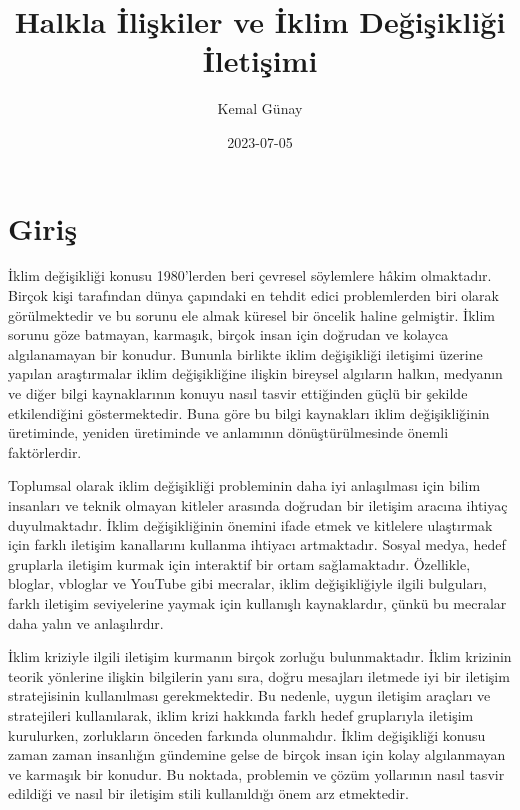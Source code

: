 \documentclass[
]{book}
\title{Halkla İlişkiler ve İklim Değişikliği İletişimi}
\author{Kemal Günay}
\date{2023-07-05}
\begin{document}
\maketitle

{
\setcounter{tocdepth}{1}
\tableofcontents
}
\hypertarget{giriux15f}{%
\chapter*{Giriş}\label{giriux15f}}

İklim değişikliği konusu 1980'lerden beri çevresel söylemlere hâkim olmaktadır. Birçok kişi tarafından dünya çapındaki en tehdit edici problemlerden biri olarak görülmektedir ve bu sorunu ele almak küresel bir öncelik haline gelmiştir. İklim sorunu göze batmayan, karmaşık, birçok insan için doğrudan ve kolayca algılanamayan bir konudur. Bununla birlikte iklim değişikliği iletişimi üzerine yapılan araştırmalar iklim değişikliğine ilişkin bireysel algıların halkın, medyanın ve diğer bilgi kaynaklarının konuyu nasıl tasvir ettiğinden güçlü bir şekilde etkilendiğini göstermektedir. Buna göre bu bilgi kaynakları iklim değişikliğinin üretiminde, yeniden üretiminde ve anlamının dönüştürülmesinde önemli faktörlerdir.\citep{mahl2020bit}

Toplumsal olarak iklim değişikliği probleminin daha iyi anlaşılması için bilim insanları ve teknik olmayan kitleler arasında doğrudan bir iletişim aracına ihtiyaç duyulmaktadır. İklim değişikliğinin önemini ifade etmek ve kitlelere ulaştırmak için farklı iletişim kanallarını kullanma ihtiyacı artmaktadır. Sosyal medya, hedef gruplarla iletişim kurmak için interaktif bir ortam sağlamaktadır. Özellikle, bloglar, vbloglar ve YouTube gibi mecralar, iklim değişikliğiyle ilgili bulguları, farklı iletişim seviyelerine yaymak için kullanışlı kaynaklardır, çünkü bu mecralar daha yalın ve anlaşılırdır. \citep{purath2019blogging}

İklim kriziyle ilgili iletişim kurmanın birçok zorluğu bulunmaktadır. İklim krizinin teorik yönlerine ilişkin bilgilerin yanı sıra, doğru mesajları iletmede iyi bir iletişim stratejisinin kullanılması gerekmektedir. Bu nedenle, uygun iletişim araçları ve stratejileri kullanılarak, iklim krizi hakkında farklı hedef gruplarıyla iletişim kurulurken, zorlukların önceden farkında olunmalıdır. \citep[3]{leal2019overview} İklim değişikliği konusu zaman zaman insanlığın gündemine gelse de birçok insan için kolay algılanmayan ve karmaşık bir konudur. Bu noktada, problemin ve çözüm yollarının nasıl tasvir edildiği ve nasıl bir iletişim stili kullanıldığı önem arz etmektedir.
\end{document}
